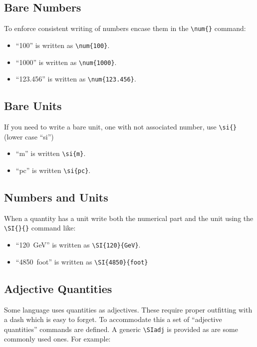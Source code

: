 \subsection{Bare Numbers}

To enforce consistent writing of numbers encase them in the
\verb|\num{}| command:

\begin{itemize}
\item ``\num{100}'' is written as \verb|\num{100}|.
\item ``\num{1000}'' is written as \verb|\num{1000}|.
\item ``\num{123.456}'' is written as \verb|\num{123.456}|.
\end{itemize}

\subsection{Bare Units}

If you need to write a bare unit, one with not associated number, use
\verb|\si{}| (lower case ``si'')

\begin{itemize}
\item ``\si{m}'' is written \verb|\si{m}|.
\item ``\si{pc}'' is written \verb|\si{pc}|.
\end{itemize}

\subsection{Numbers and Units}

When a quantity has a unit write both the numerical part and the unit
using the \verb|\SI{}{}| command like:

\begin{itemize}
\item ``\SI{120}{GeV}'' is written as \verb|\SI{120}{GeV}|.
\item ``\SI{4850}{foot}'' is written as \verb|\SI{4850}{foot}|
\end{itemize}

\subsection{Adjective Quantities}

Some language uses quantities as adjectives.
These require proper outfitting with a dash which is easy to forget.
To accommodate this a set of ``adjective quantities'' commands are defined.
A generic \verb|\SIadj| is provided as are some commonly used ones.
For example:

